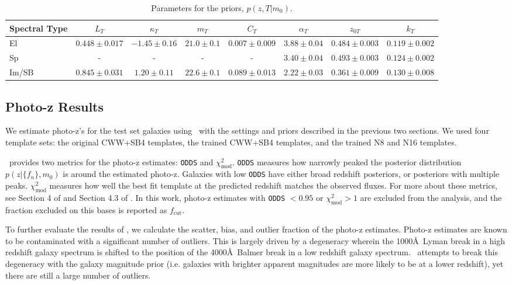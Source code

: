 \begin{table}
    \caption{Parameters for the priors, $p(z,T|m_0)$.}
    \label{tab:prior_params}
    \centering
    \begin{tabular}{l c c c c c c c }
        \hline \hline
         Spectral Type & $L_T$ & $\kappa_T$ & $m_T$ & $C_T$ & $\alpha_T$ & $z_{0T}$ & $k_T$ \\
         \hline
         
         El & $0.448 \pm 0.017$ & $-1.45 \pm 0.16$ & $21.0 \pm 0.1$ & $0.007 \pm 0.009$ & $3.88 \pm 0.04$ & $0.484 \pm 0.003$ & $0.119 \pm 0.002$ \\
         Sp & - & - & - & - & $3.40 \pm 0.04$ & $0.493 \pm 0.003$ & $0.124 \pm 0.002$ \\
         Im/SB & $0.845 \pm 0.031$ & $1.20 \pm 0.11$ & $22.6 \pm 0.1$ & $0.089 \pm 0.013$ & $2.22 \pm 0.03$ & $0.361 \pm 0.009$ & $0.130 \pm 0.008$ \\
        
        \hline
    \end{tabular}
\end{table}


\subsection{Photo-z Results}
\label{sect:photoz_results}

We estimate photo-z's for the test set galaxies using \bpz\ with the settings and priors described in the previous two sections.
We used four template sets: the original CWW+SB4 templates, the trained CWW+SB4 templates, and the trained N8 and N16 templates.

\bpz\ provides two metrics for the photo-z estimates: \texttt{ODDS} and $\chi_{\text{mod}}^2$.
\texttt{ODDS} measures how narrowly peaked the posterior distribution $p(z|\{f_n\},m_0)$ is around the estimated photo-z.
Galaxies with low \texttt{ODDS} have either broad redshift posteriors, or posteriors with multiple peaks.
$\chi_{\text{mod}}^2$ measures how well the best fit template at the predicted redshift matches the observed fluxes. 
For more about these metrics, see Section 4 of \citet{Benitez2000a} and Section 4.3 of \citet{Coe2006a}.
In this work, photo-z estimates with \texttt{ODDS} $< 0.95$ or $\chi_{\text{mod}}^2 > 1$ are excluded from the analysis, and the fraction excluded on this bases is reported as $f_\text{cut}$.

To further evaluate the results of \bpz, we calculate the scatter, bias, and outlier fraction of the photo-z estimates. 
Photo-z estimates are known to be contaminated with a significant number of outliers.
This is largely driven by a degeneracy wherein the 1000\AA\ Lyman break in a high redshift galaxy spectrum is shifted to the position of the 4000\AA\ Balmer break in a low redshift galaxy spectrum. 
\bpz\ attempts to break this degeneracy with the galaxy magnitude prior (i.e. galaxies with brighter apparent magnitudes are more likely to be at a lower redshift), yet there are still a large number of outliers.

